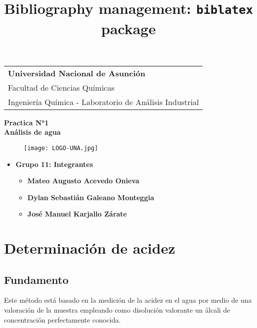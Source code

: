 \documentclass[a4paper,12pt]{article} %
\title{Bibliography management: \texttt{biblatex} package}
\begin{document}
\thispagestyle{empty} 
\begin{tabular}{p{15.5cm}}
{\large \bf Universidad Nacional de Asunción} \\
Facultad de Ciencias Químicas \\ 
Ingeniería Química - Laboratorio de Análisis Industrial \\
\hline
\end{tabular} 

\vspace*{0.3cm} %

\begin{center} 
    {\Large \bf Practica N°1  \\ \vspace{3mm} Análisis de agua}
    \vspace{5mm}
    \begin{figure}[H] 
        \centering
        \texttt{[image: LOGO-UNA.jpg]}
    \end{figure}
\end{center}  

\vspace{15mm}

\begin{itemize}
    \item \textbf{Grupo 11: Integrantes}
    \begin{itemize}
        \item{\bf Mateo Augusto Acevedo Onieva}
        \item{\bf Dylan Sebastián Galeano Monteggia}
        \item{\bf José Manuel Karjallo Zárate}
    \end{itemize}
\end{itemize}



\newpage

\section{Determinación de acidez}

\subsection{Fundamento} 
Este método está basado en la medición de la acidez en el agua por medio de una valoración de la muestra empleando como disolución valorante un álcali de concentración perfectamente conocida.         
\end{document}
